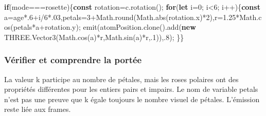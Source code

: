 \documentclass[
  canadien,
  11pt,
  letterpaper,
]{article}
\newenvironment{Shaded}{}{}
\newcommand{\AttributeTok}[1]{\textcolor[rgb]{0.49,0.56,0.16}{#1}}
\newcommand{\BaseNTok}[1]{\textcolor[rgb]{0.25,0.63,0.44}{#1}}
\newcommand{\BuiltInTok}[1]{\textcolor[rgb]{0.00,0.50,0.00}{#1}}
\newcommand{\ControlFlowTok}[1]{\textcolor[rgb]{0.00,0.44,0.13}{\textbf{#1}}}
\newcommand{\DecValTok}[1]{\textcolor[rgb]{0.25,0.63,0.44}{#1}}
\newcommand{\FloatTok}[1]{\textcolor[rgb]{0.25,0.63,0.44}{#1}}
\newcommand{\FunctionTok}[1]{\textcolor[rgb]{0.02,0.16,0.49}{#1}}
\newcommand{\KeywordTok}[1]{\textcolor[rgb]{0.00,0.44,0.13}{\textbf{#1}}}
\newcommand{\NormalTok}[1]{#1}
\newcommand{\OperatorTok}[1]{\textcolor[rgb]{0.40,0.40,0.40}{#1}}
\newcommand{\StringTok}[1]{\textcolor[rgb]{0.25,0.44,0.63}{#1}}
\begin{document}
\begin{Shaded}
\begin{Highlighting}[]
\ControlFlowTok{if}\NormalTok{(mode}\OperatorTok{===}\StringTok{\textquotesingle{}rosette\textquotesingle{}}\NormalTok{)\{}\KeywordTok{const}\NormalTok{ rotation}\OperatorTok{=}\NormalTok{c}\OperatorTok{.}\FunctionTok{rotation}\NormalTok{()}\OperatorTok{;}
\ControlFlowTok{for}\NormalTok{(}\KeywordTok{let}\NormalTok{ i}\OperatorTok{=}\DecValTok{0}\OperatorTok{;}
\NormalTok{i}\OperatorTok{\textless{}}\DecValTok{6}\OperatorTok{;}
\NormalTok{i}\OperatorTok{++}\NormalTok{)\{}\KeywordTok{const}\NormalTok{ a}\OperatorTok{=}\NormalTok{age}\OperatorTok{*.}\DecValTok{6}\OperatorTok{+}\NormalTok{i}\OperatorTok{/}\DecValTok{6}\OperatorTok{*.}\BaseNTok{03}\OperatorTok{,}\NormalTok{petals}\OperatorTok{=}\DecValTok{3}\OperatorTok{+}\BuiltInTok{Math}\OperatorTok{.}\FunctionTok{round}\NormalTok{(}\BuiltInTok{Math}\OperatorTok{.}\FunctionTok{abs}\NormalTok{(rotation}\OperatorTok{.}\AttributeTok{x}\NormalTok{)}\OperatorTok{*}\DecValTok{2}\NormalTok{)}\OperatorTok{,}\NormalTok{r}\OperatorTok{=}\FloatTok{1.25}\OperatorTok{*}\BuiltInTok{Math}\OperatorTok{.}\FunctionTok{cos}\NormalTok{(petals}\OperatorTok{*}\NormalTok{a}\OperatorTok{+}\NormalTok{rotation}\OperatorTok{.}\AttributeTok{y}\NormalTok{)}\OperatorTok{;}
\FunctionTok{emit}\NormalTok{(atomPosition}\OperatorTok{.}\FunctionTok{clone}\NormalTok{()}\OperatorTok{.}\FunctionTok{add}\NormalTok{(}\KeywordTok{new}\NormalTok{ THREE}\OperatorTok{.}\FunctionTok{Vector3}\NormalTok{(}\BuiltInTok{Math}\OperatorTok{.}\FunctionTok{cos}\NormalTok{(a)}\OperatorTok{*}\NormalTok{r}\OperatorTok{,}\BuiltInTok{Math}\OperatorTok{.}\FunctionTok{sin}\NormalTok{(a)}\OperatorTok{*}\NormalTok{r}\OperatorTok{,.}\DecValTok{1}\NormalTok{))}\OperatorTok{,.}\DecValTok{8}\NormalTok{)}\OperatorTok{;}
\NormalTok{\}\}}
\end{Highlighting}
\end{Shaded}

\subsubsection{Vérifier et comprendre la
portée}\label{vuxe9rifier-et-comprendre-la-portuxe9e-8}

La valeur k participe au nombre de pétales, mais les roses polaires ont
des propriétés différentes pour les entiers pairs et impairs. Le nom de
variable petals n'est pas une preuve que k égale toujours le nombre
visuel de pétales. L'émission reste liée aux frames.
\end{document}
